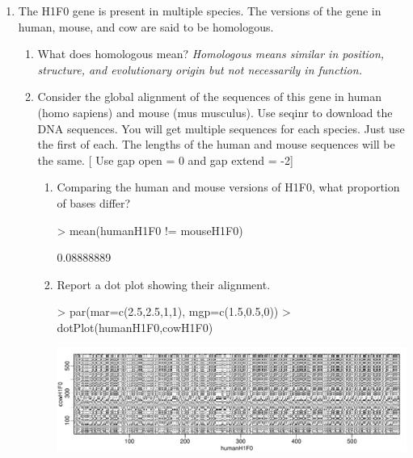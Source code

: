 \documentclass[12pt,a4paper]{paper}
\begin{document}
\begin{enumerate}
\begin{enumerate}
\begin{enumerate}
\end{enumerate}
\end{enumerate}
\item The H1F0 gene is present in multiple species. The versions of the gene in human, mouse, and cow are said to be homologous.
\begin{Schunk}
\end{Schunk}
\begin{enumerate}
\item What does homologous mean?
\textit{Homologous means similar in position, structure, and evolutionary origin but not necessarily in function.}
\item Consider the global alignment of the sequences of this gene in human (homo sapiens) and mouse (mus musculus). Use seqinr to download the DNA sequences. You will get multiple sequences for each species. Just use the first of each. The lengths of the human and mouse sequences will be the same. [ Use gap open = 0 and gap extend = -2]
\begin{enumerate}
\item Comparing the human and mouse versions of H1F0, what proportion of bases differ?
\begin{Schunk}
\begin{Sinput}
> mean(humanH1F0 != mouseH1F0)
\end{Sinput}
\begin{Soutput}
[1] 0.08888889
\end{Soutput}
\end{Schunk}
\item Report a dot plot showing their alignment.
\begin{Schunk}
\begin{Sinput}
> par(mar=c(2.5,2.5,1,1), mgp=c(1.5,0.5,0))
> dotPlot(humanH1F0,cowH1F0)
\end{Sinput}
\end{Schunk}
\includegraphics{Osorio_Daniel_HW4-013}

\end{enumerate}
\end{enumerate}
\end{enumerate}
\end{document}
